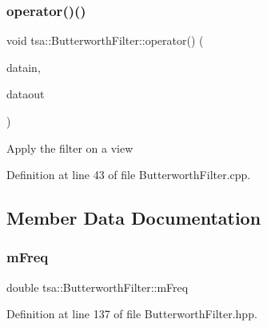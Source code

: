 \mbox{\label{classtsa_1_1_butterworth_filter_a68cf85f26d694402fe52601707cf9bbb}} 
\subsubsection{\texorpdfstring{operator()()}{operator()()}\hspace{0.1cm}{\footnotesize\ttfamily [2/2]}}
{\footnotesize\ttfamily void tsa\+::\+Butterworth\+Filter\+::operator() (\begin{DoxyParamCaption}\item[{\hyperlink{namespacetsa_ab32775c889b53c40fa83939f22372b75}{Seq\+View\+Complex} \&}]{datain,  }\item[{\hyperlink{namespacetsa_ab32775c889b53c40fa83939f22372b75}{Seq\+View\+Complex} \&}]{dataout }\end{DoxyParamCaption})}

Apply the filter on a view 

Definition at line 43 of file Butterworth\+Filter.\+cpp.



\subsection{Member Data Documentation}
\mbox{\label{classtsa_1_1_butterworth_filter_a7bff04791bdba8c8b668e8b664f01e60}} 
\subsubsection{\texorpdfstring{m\+Freq}{mFreq}}
{\footnotesize\ttfamily double tsa\+::\+Butterworth\+Filter\+::m\+Freq\hspace{0.3cm}{\ttfamily [private]}}



Definition at line 137 of file Butterworth\+Filter.\+hpp.

\mbox{\label{classtsa_1_1_butterworth_filter_ad81a41345c8b088c6aa02f138b39348b}} 
